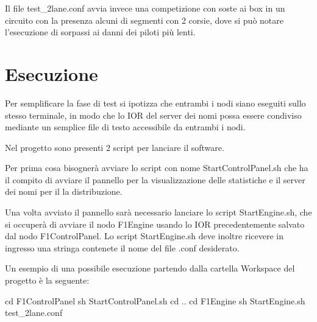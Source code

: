 \documentclass[a4paper,11pt, twoside]{book}
\begin{document}
	Il file test\_2lane.conf avvia invece una competizione con soste ai box in un circuito con la presenza alcuni di segmenti
	con 2 corsie, dove si può notare l'esecuzione di sorpassi ai danni dei piloti più lenti.
	
    \section{Esecuzione}
      Per semplificare la fase di test si ipotizza che entrambi i nodi siano eseguiti sullo stesso terminale, in modo che lo IOR 
      del server dei nomi possa essere condiviso mediante un semplice file di testo accessibile da entrambi i nodi.
      
      Nel progetto sono presenti 2 script per lanciare il software. 
      
      Per prima cosa bisognerà avviare lo script con nome StartControlPanel.sh che ha il compito di avviare il pannello
      per la visualizzazione delle statistiche e il server dei nomi per il la distribuzione.
      
      Una volta avviato il pannello sarà necessario lanciare lo script StartEngine.sh, che si occuperà di avviare il nodo F1Engine
      usando lo IOR precedentemente salvato dal nodo F1ControlPanel.
      Lo script StartEngine.sh deve inoltre ricevere in ingresso una stringa contenete il nome del file .conf
      desiderato.
      
      Un esempio di una possibile esecuzione partendo dalla cartella Workspace del progetto è la seguente:
      
      \begin{xml}
        cd F1ControlPanel
	sh StartControlPanel.sh
	cd ..
	cd F1Engine
	sh StartEngine.sh test_2lane.conf
      \end{xml}
\end{document}
